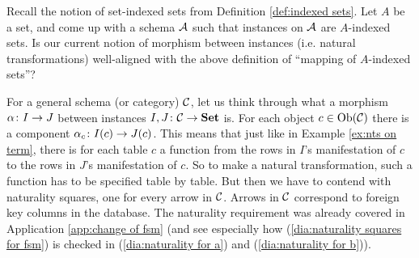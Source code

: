 \documentclass[CT4S-EN-RU]{subfiles}
\begin{document}
\begin{exercise}\label{exc:indexed sets as functors}
Recall the notion of set-indexed sets from Definition \ref{def:indexed sets}. Let $A$ be a set, and come up with a schema $\mathcal{A}$ such that instances on $\mathcal{A}$ are $A$-indexed sets. Is our current notion of morphism between instances (i.e. natural transformations) well-aligned with the above definition of “mapping of $A$-indexed sets”?
\end{exercise}

For a general schema (or category) $\mathcal{C}$, let us think through what a morphism $\alpha\colon I\rightarrow J$ between instances $I,J\colon\mathcal{C}\rightarrow{\bf Set}$ is. For each object $c\in\textnormal{Ob}(\mathcal{C})$ there is a component $\alpha_c\colon I(c)\rightarrow J(c)$. This means that just like in Example \ref{ex:nts on term}, there is for each table $c$ a function from the rows in $I$'s manifestation of $c$ to the rows in $J$'s manifestation of $c$. So to make a natural transformation, such a function has to be specified table by table. But then we have to contend with naturality squares, one for every arrow in $\mathcal{C}$. Arrows in $\mathcal{C}$ correspond to foreign key columns in the database. The naturality requirement was already covered in Application \ref{app:change of fsm} (and see especially how (\ref{dia:naturality squares for fsm}) is checked in (\ref{dia:naturality for a}) and (\ref{dia:naturality for b})).
\end{document}
